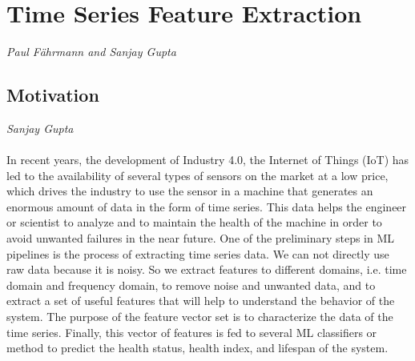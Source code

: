 %
\chapter{Time Series Feature Extraction}
\label{sec:feature-extraction}
\vspace*{-15mm}
\hfill{\normalsize\emph{Paul Fährmann and Sanjay Gupta}}


\section{Motivation}
\vspace*{-15mm}
\hfill{\normalsize\emph{Sanjay Gupta}}
\\\\
In recent years, the development of Industry 4.0, the Internet of Things (IoT) has led to the availability of several types of sensors on the market at a low price, which drives the industry to use the sensor in a machine that generates an enormous amount of data in the form of time series. This data helps the engineer or scientist to analyze and to maintain the health of the machine in order to avoid unwanted failures in the near future. One of the preliminary steps in ML pipelines is the process of extracting time series data. We can not directly use raw data because it is noisy. So we extract features to different domains, i.e. time domain and frequency domain, to remove noise and unwanted data, and to extract a set of useful features that will help to understand the behavior of the system. The purpose of the feature vector set is to characterize the data of the time series. Finally, this vector of features is fed to several ML classifiers or method to predict the health status, health index, and lifespan of the system.


